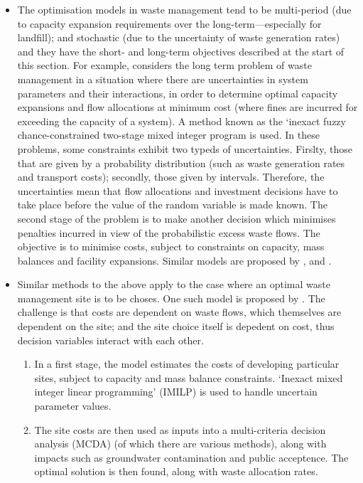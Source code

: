 \begin{itemize}
	\item The optimisation models in waste management tend to be multi-period (due to capacity expansion requirements over the long-term---especially for landfill); and stochastic (due to the uncertainty of waste generation rates) and they have the short- and long-term objectives described at the start of this section. For example, \citet{Guo2009} considers the long term problem of waste management in a situation where there are uncertainties in system parameters and their interactions, in order to determine optimal capacity expansions and flow allocations at minimum cost (where fines are incurred for exceeding the capacity of a system). A method known as the `inexact fuzzy chance-constrained two-stage mixed integer program is used. In these problems, some constraints exhibit two typeds of uncertainties. Firslty, those that are given by a probability distribution (such as waste generation rates and transport costs); secondly, those given by intervals. Therefore, the uncertainties mean that flow allocations and investment decisions have to take place before the value of the random variable is made known. The second stage of the problem is to make another decision which minimises penalties incurred in view of the probabilistic excess waste flows. The objective is to minimise costs, subject to constraints on capacity, mass balances and facility expansions. Similar models are proposed by \citet{Li2006}, \citet{He2009} and \citet{Xi2010}. 
	\item Similar methods to the above apply to the case where an optimal waste management site is to be choses. One such model is proposed by \citet{Cheng2003}. The challenge is that costs are dependent on waste flows, which themselves are dependent on the site; and the site choice itself is depedent on cost, thus decision variables interact with each other.
\begin{enumerate}
	\item In a first stage, the model estimates the costs of developing particular sites, subject to capacity and mass balance constraints. `Inexact mixed integer linear programming' (IMILP) is used to handle uncertain parameter values.
	\item The site costs are then used as inputs into a multi-criteria decision analysis (MCDA) (of which there are various methods), along with impacts such as groundwater contamination and public acceptence. The optimal solution is then found, along with waste allocation rates.
\end{enumerate}
\end{itemize}

